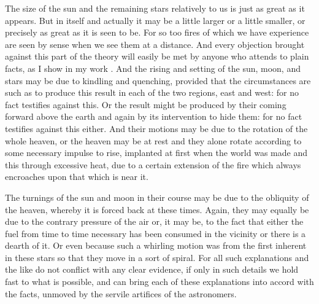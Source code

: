 \documentclass{stex}
\begin{document}
The size of the sun and the remaining stars relatively to us is just as great as it appears.
But in itself and actually it may be a little larger or a little smaller, or precisely as great as it is seen to be.
For so too fires of which we have experience are seen by sense when we see them at a distance.
And every objection brought against this part of the theory will easily be met by anyone who attends to plain facts, as I show in my work .
And the rising and setting of the sun, moon, and stars may be due to kindling and quenching, provided that the circumstances are such as to produce this result in each of the two regions, east and west: for no fact testifies against this.
Or the result might be produced by their coming forward above the earth and again by its intervention to hide them: for no fact testifies against this either.
And their motions may be due to the rotation of the whole heaven, or the heaven may be at rest and they alone rotate according to some necessary impulse to rise, implanted at first when the world was made \textelp{} and this through excessive heat, due to a certain extension of the fire which always encroaches upon that which is near it.

The turnings of the sun and moon in their course may be due to the obliquity of the heaven, whereby it is forced back at these times.
Again, they may equally be due to the contrary pressure of the air or, it may be, to the fact that either the fuel from time to time necessary has been consumed in the vicinity or there is a dearth of it.
Or even because such a whirling motion was from the first inherent in these stars so that they move in a sort of spiral.
For all such explanations and the like do not conflict with any clear evidence, if only in such details we hold fast to what is possible, and can bring each of these explanations into accord with the facts, unmoved by the servile artifices of the astronomers.
\end{document}
